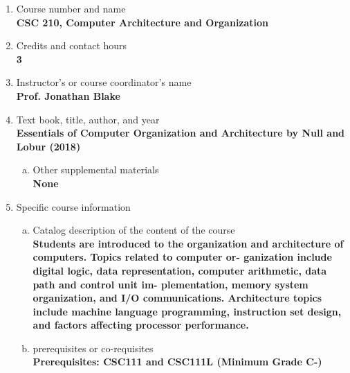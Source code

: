 \label{CSC210}  %
\begin{enumerate}[1.]
\item Course number and name\\
  {\bfseries
CSC 210, Computer Architecture and Organization
  }

\item Credits and contact hours\\
  {\bfseries
3
  }

\item Instructor's or course coordinator's name\\
  {\bfseries
Prof. Jonathan Blake
  }

\item Text book, title, author, and year\\
  {\bfseries
    Essentials of Computer Organization and Architecture by Null and Lobur (2018)
  }
\begin{enumerate}[a.]
\item Other supplemental materials\\
  {\bfseries
    None
  }
\end{enumerate}

\item Specific course information
\begin{enumerate}[a.]
\item Catalog description of the content of the course\\
  {\bfseries
Students are introduced to the organization and architecture of computers. Topics related to computer or-
ganization include digital logic, data representation, computer arithmetic, data path and control unit im-
plementation, memory system organization, and I/O communications. Architecture topics include machine
language programming, instruction set design, and factors affecting processor performance.
  }

\item prerequisites or co-requisites\\
  {\bfseries
    Prerequisites: CSC111 and CSC111L (Minimum Grade C-)
  }


\end{enumerate}
\end{enumerate}
